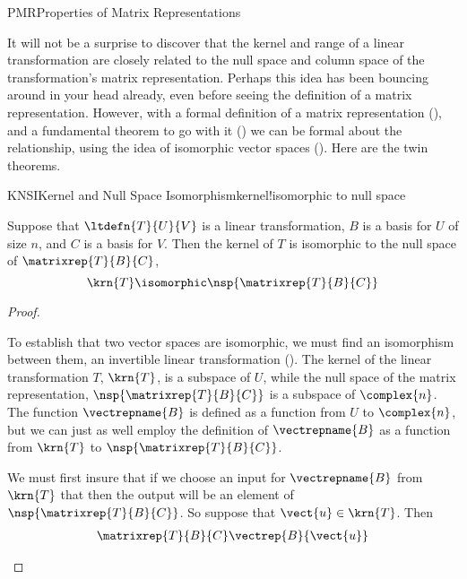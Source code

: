 %
\begin{subsect}{PMR}{Properties of Matrix Representations}
%
\begin{para}It will not be a surprise to discover that the kernel and range of a linear transformation are closely related to the null space and column space of the transformation's matrix representation.  Perhaps this idea has been bouncing around in your head already, even before seeing the definition of a matrix representation.  However, with a formal definition of a matrix representation (), and a fundamental theorem to go with it () we can be formal about the relationship, using the idea of isomorphic vector spaces ().  Here are the twin theorems.\end{para}
%
\begin{theorem}{KNSI}{Kernel and Null Space Isomorphism}{kernel!isomorphic to null space}
\begin{para}Suppose that $\ltdefn{T}{U}{V}$ is a linear transformation, $B$ is a basis for $U$ of size $n$, and $C$ is a basis for $V$.  Then the kernel of $T$ is isomorphic to the null space of $\matrixrep{T}{B}{C}$,
%
\begin{equation*}
\krn{T}\isomorphic\nsp{\matrixrep{T}{B}{C}}
\end{equation*}
\end{para}
%
\end{theorem}
%
\begin{proof}
\begin{para}To establish that two vector spaces are isomorphic, we must find an isomorphism between them, an invertible linear transformation ().  The kernel of the linear transformation $T$, $\krn{T}$, is a subspace of $U$, while the null space of the matrix representation, $\nsp{\matrixrep{T}{B}{C}}$ is a subspace of $\complex{n}$.  The function $\vectrepname{B}$ is defined as a function from $U$ to $\complex{n}$, but we can just as well employ the definition of $\vectrepname{B}$ as a function from $\krn{T}$ to $\nsp{\matrixrep{T}{B}{C}}$.\end{para}
%
\begin{para}We must first insure that if we choose an input for $\vectrepname{B}$ from $\krn{T}$ that then the output will be an element of $\nsp{\matrixrep{T}{B}{C}}$.  So suppose that $\vect{u}\in\krn{T}$.  Then
%
\begin{align*}
\matrixrep{T}{B}{C}\vectrep{B}{\vect{u}}

\end{align*}
\end{para}
\end{proof}
\end{subsect}
